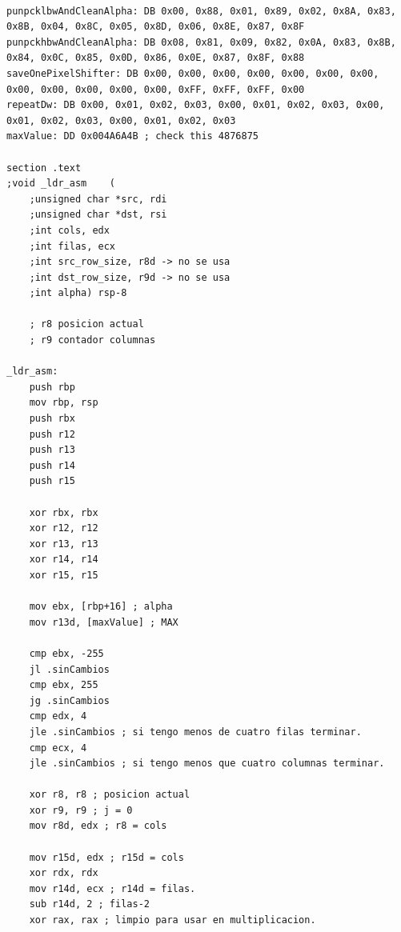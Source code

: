 \begin{codesnippet}
\begin{verbatim}

punpcklbwAndCleanAlpha: DB 0x00, 0x88, 0x01, 0x89, 0x02, 0x8A, 0x83, 0x8B, 0x04, 0x8C, 0x05, 0x8D, 0x06, 0x8E, 0x87, 0x8F 
punpckhbwAndCleanAlpha: DB 0x08, 0x81, 0x09, 0x82, 0x0A, 0x83, 0x8B, 0x84, 0x0C, 0x85, 0x0D, 0x86, 0x0E, 0x87, 0x8F, 0x88 
saveOnePixelShifter: DB 0x00, 0x00, 0x00, 0x00, 0x00, 0x00, 0x00, 0x00, 0x00, 0x00, 0x00, 0x00, 0xFF, 0xFF, 0xFF, 0x00
repeatDw: DB 0x00, 0x01, 0x02, 0x03, 0x00, 0x01, 0x02, 0x03, 0x00, 0x01, 0x02, 0x03, 0x00, 0x01, 0x02, 0x03
maxValue: DD 0x004A6A4B ; check this 4876875

section .text
;void _ldr_asm    (
	;unsigned char *src, rdi
	;unsigned char *dst, rsi
	;int cols, edx
	;int filas, ecx
	;int src_row_size, r8d -> no se usa
	;int dst_row_size, r9d -> no se usa
	;int alpha) rsp-8

	; r8 posicion actual
	; r9 contador columnas

_ldr_asm:
	push rbp
	mov rbp, rsp
	push rbx
	push r12
	push r13
	push r14
	push r15

	xor rbx, rbx
	xor r12, r12
	xor r13, r13
	xor r14, r14
	xor r15, r15
	
	mov ebx, [rbp+16] ; alpha
	mov r13d, [maxValue] ; MAX

	cmp ebx, -255
	jl .sinCambios
	cmp ebx, 255
	jg .sinCambios
	cmp edx, 4
	jle .sinCambios ; si tengo menos de cuatro filas terminar.
	cmp ecx, 4
	jle .sinCambios ; si tengo menos que cuatro columnas terminar.

	xor r8, r8 ; posicion actual
	xor r9, r9 ; j = 0
	mov r8d, edx ; r8 = cols

	mov r15d, edx ; r15d = cols
	xor rdx, rdx
	mov r14d, ecx ; r14d = filas.
	sub r14d, 2 ; filas-2
	xor rax, rax ; limpio para usar en multiplicacion.
\end{verbatim}
\end{codesnippet}

